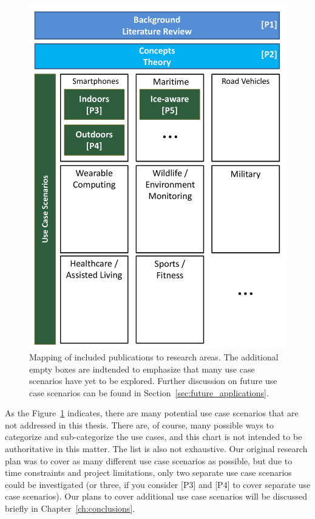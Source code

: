 \begin{figure}
  \begin{center}
    \includegraphics[width=1.0\textwidth]{Images/figChapter4}
  \end{center}
  \caption[Mapping of included publications to research areas]{Mapping of included publications to research areas. The additional empty boxes are indtended to emphasize that many use case scenarios have yet to be explored. Further discussion on future use case scenarios can be found in Section~\ref{sec:future_applications}.}
  \label{fig:publication-chart}
\end{figure}

As the Figure~\ref{fig:publication-chart} indicates, there are many potential use case scenarios that are not addressed in this thesis. There are, of course, many possible ways to categorize and sub-categorize the use cases, and this chart is not intended to be authoritative in this matter. The list is also not exhaustive. Our original research plan was to cover as many different use case scenarios as possible, but due to time constraints and project limitations, only two separate use case scenarios could be investigated (or three, if you consider [P3] and [P4] to cover separate use case scenarios). Our plans to cover additional use case scenarios will be discussed briefly in Chapter~\ref{ch:conclusions}.


